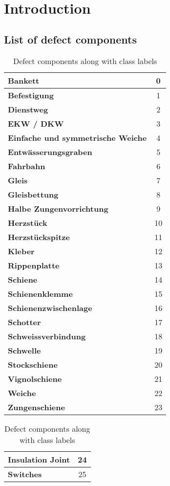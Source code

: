 \chapter{Introduction}
\section{List of defect components}
\label{app:defcomp}
\begin{table}[H]
	\centering
	\begin{tabular}{|l|c|} \hline
		\textbf{Bankett} & 0 \\ \hline 
		\textbf{Befestigung} & 1\\ \hline
		\textbf{Dienstweg} & 2\\ \hline
		\textbf{EKW / DKW} & 3\\ \hline
		\textbf{Einfache und symmetrische Weiche} & 4\\ \hline
		\textbf{Entwässerungsgraben} & 5\\ \hline
		\textbf{Fahrbahn} & 6\\ \hline
		\textbf{Gleis} & 7\\ \hline
		\textbf{Gleisbettung} & 8\\ \hline
		\textbf{Halbe Zungenvorrichtung} & 9\\ \hline
		\textbf{Herzstück} & 10\\ \hline
		\textbf{Herzstückspitze} & 11\\ \hline
		\textbf{Kleber} & 12\\ \hline
		\textbf{Rippenplatte} & 13\\ \hline
		\textbf{Schiene} & 14\\ \hline
		\textbf{Schienenklemme} & 15\\ \hline
		\textbf{Schienenzwischenlage} & 16\\ \hline
		\textbf{Schotter} & 17\\ \hline
		\textbf{Schweissverbindung} & 18\\ \hline
		\textbf{Schwelle} & 19\\ \hline
		\textbf{Stockschiene} & 20\\ \hline
		\textbf{Vignolschiene} & 21\\ \hline
		\textbf{Weiche} & 22\\ \hline
		\textbf{Zungenschiene} & 23\\ \hline
	\end{tabular}
	\hspace*{0.5cm}	
	\begin{tabular}{|l|c|} \hline
		\textbf{Insulation Joint} & 24 \\ \hline
		\textbf{Switches} & 25 \\ \hline 
	\end{tabular}
	\caption{Defect components along with class labels}
\end{table}

